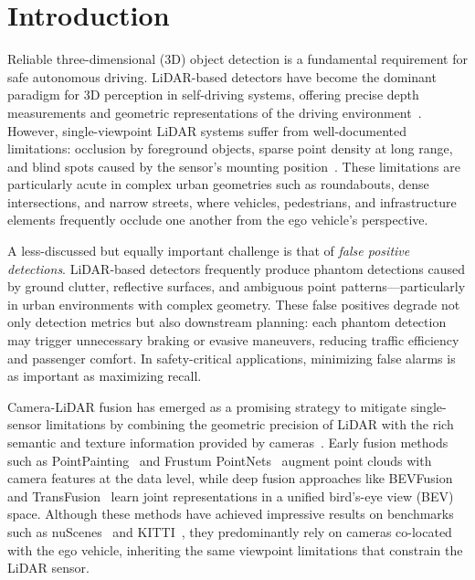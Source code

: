 \documentclass[sustainability,article,submit,moreauthors,pdftex]{Definitions/mdpi}
\begin{document}

\section{Introduction}\label{sec:intro}

Reliable three-dimensional (3D) object detection is a fundamental requirement for safe autonomous driving. LiDAR-based detectors have become the dominant paradigm for 3D perception in self-driving systems, offering precise depth measurements and geometric representations of the driving environment~\cite{fernandes20213d,li2023bevsurvey}. However, single-viewpoint LiDAR systems suffer from well-documented limitations: occlusion by foreground objects, sparse point density at long range, and blind spots caused by the sensor's mounting position~\cite{hu2022investigating}. These limitations are particularly acute in complex urban geometries such as roundabouts, dense intersections, and narrow streets, where vehicles, pedestrians, and infrastructure elements frequently occlude one another from the ego vehicle's perspective.

A less-discussed but equally important challenge is that of \emph{false positive detections}. LiDAR-based detectors frequently produce phantom detections caused by ground clutter, reflective surfaces, and ambiguous point patterns---particularly in urban environments with complex geometry. These false positives degrade not only detection metrics but also downstream planning: each phantom detection may trigger unnecessary braking or evasive maneuvers, reducing traffic efficiency and passenger comfort. In safety-critical applications, minimizing false alarms is as important as maximizing recall.

Camera-LiDAR fusion has emerged as a promising strategy to mitigate single-sensor limitations by combining the geometric precision of LiDAR with the rich semantic and texture information provided by cameras~\cite{cui2022deep,wang2023multi}. Early fusion methods such as PointPainting~\cite{vora2020pointpainting} and Frustum PointNets~\cite{qi2018frustum} augment point clouds with camera features at the data level, while deep fusion approaches like BEVFusion~\cite{liu2023bevfusion,liang2022bevfusion} and TransFusion~\cite{bai2022transfusion} learn joint representations in a unified bird's-eye view (BEV) space. Although these methods have achieved impressive results on benchmarks such as nuScenes~\cite{caesar2020nuscenes} and KITTI~\cite{geiger2012kitti}, they predominantly rely on cameras co-located with the ego vehicle, inheriting the same viewpoint limitations that constrain the LiDAR sensor.
\end{document}
